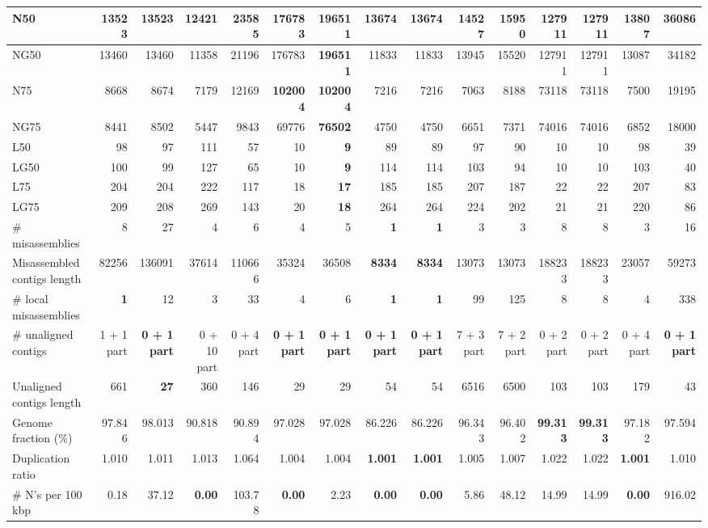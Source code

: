 \documentclass[12pt,a4paper]{article}
\begin{document}
\begin{table}[ht]
\begin{center}
\begin{tabular}{|l*{14}{|r}|}
N50 & 13523 & 13523 & 12421 & 23585 & 176783 & {\bf 196511} & 13674 & 13674 & 14527 & 15950 & 127911 & 127911 & 13807 & 36086 \\ \hline
NG50 & 13460 & 13460 & 11358 & 21196 & 176783 & {\bf 196511} & 11833 & 11833 & 13945 & 15520 & 127911 & 127911 & 13087 & 34182 \\ \hline
N75 & 8668 & 8674 & 7179 & 12169 & {\bf 102004} & {\bf 102004} & 7216 & 7216 & 7063 & 8188 & 73118 & 73118 & 7500 & 19195 \\ \hline
NG75 & 8441 & 8502 & 5447 & 9843 & 69776 & {\bf 76502} & 4750 & 4750 & 6651 & 7371 & 74016 & 74016 & 6852 & 18000 \\ \hline
L50 & 98 & 97 & 111 & 57 & 10 & {\bf 9} & 89 & 89 & 97 & 90 & 10 & 10 & 98 & 39 \\ \hline
LG50 & 100 & 99 & 127 & 65 & 10 & {\bf 9} & 114 & 114 & 103 & 94 & 10 & 10 & 103 & 40 \\ \hline
L75 & 204 & 204 & 222 & 117 & 18 & {\bf 17} & 185 & 185 & 207 & 187 & 22 & 22 & 207 & 83 \\ \hline
LG75 & 209 & 208 & 269 & 143 & 20 & {\bf 18} & 264 & 264 & 224 & 202 & 21 & 21 & 220 & 86 \\ \hline
\# misassemblies & 8 & 27 & 4 & 6 & 4 & 5 & {\bf 1} & {\bf 1} & 3 & 3 & 8 & 8 & 3 & 16 \\ \hline
Misassembled contigs length & 82256 & 136091 & 37614 & 110666 & 35324 & 36508 & {\bf 8334} & {\bf 8334} & 13073 & 13073 & 188233 & 188233 & 23057 & 59273 \\ \hline
\# local misassemblies & {\bf 1} & 12 & 3 & 33 & 4 & 6 & {\bf 1} & {\bf 1} & 99 & 125 & 8 & 8 & 4 & 338 \\ \hline
\# unaligned contigs & 1 + 1 part & {\bf 0 + 1 part} & 0 + 10 part & 0 + 4 part & {\bf 0 + 1 part} & {\bf 0 + 1 part} & {\bf 0 + 1 part} & {\bf 0 + 1 part} & 7 + 3 part & 7 + 2 part & 0 + 2 part & 0 + 2 part & 0 + 4 part & {\bf 0 + 1 part} \\ \hline
Unaligned contigs length & 661 & {\bf 27} & 360 & 146 & 29 & 29 & 54 & 54 & 6516 & 6500 & 103 & 103 & 179 & 43 \\ \hline
Genome fraction (\%) & 97.846 & 98.013 & 90.818 & 90.894 & 97.028 & 97.028 & 86.226 & 86.226 & 96.343 & 96.402 & {\bf 99.313} & {\bf 99.313} & 97.182 & 97.594 \\ \hline
Duplication ratio & 1.010 & 1.011 & 1.013 & 1.064 & 1.004 & 1.004 & {\bf 1.001} & {\bf 1.001} & 1.005 & 1.007 & 1.022 & 1.022 & {\bf 1.001} & 1.010 \\ \hline
\# N's per 100 kbp & 0.18 & 37.12 & {\bf 0.00} & 103.78 & {\bf 0.00} & 2.23 & {\bf 0.00} & {\bf 0.00} & 5.86 & 48.12 & 14.99 & 14.99 & {\bf 0.00} & 916.02 \\ \hline

\end{tabular}
\end{center}
\end{table}
\end{document}
